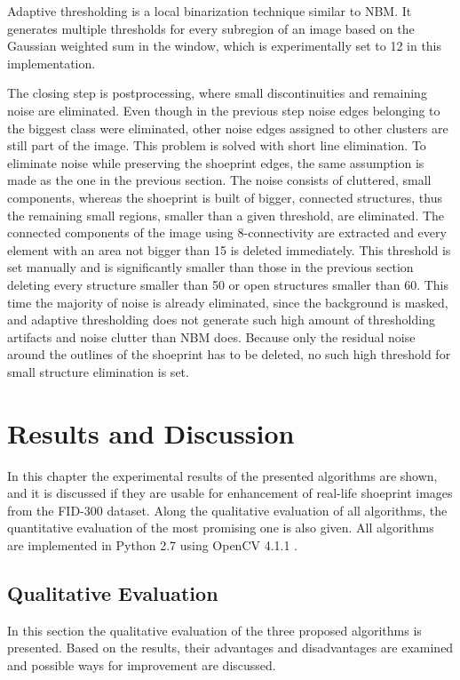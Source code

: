 \documentclass[draft,final]{vutinfth} %
\begin{document}
Adaptive thresholding is a local binarization technique similar to NBM.
It generates multiple thresholds for every subregion of an image based on the Gaussian weighted sum in the window, which is experimentally set to 12 in this implementation.
\par
The closing step is postprocessing, where small discontinuities and remaining noise are eliminated.
Even though in the previous step noise edges belonging to the biggest class were eliminated, other noise edges assigned to other clusters are still part of the image.
This problem is solved with short line elimination.
To eliminate noise while preserving the shoeprint edges, the same assumption is made as the one in the previous section.
The noise consists of cluttered, small components, whereas the shoeprint is built of bigger, connected structures, thus the remaining small regions, smaller than a given threshold, are eliminated.
The connected components of the image using 8-connectivity are extracted and every element with an area not bigger than 15 is deleted immediately.
This threshold is set manually and is significantly smaller than those in the previous section deleting every structure smaller than 50 or open structures smaller than 60.
This time the majority of noise is already eliminated, since the background is masked, and adaptive thresholding does not generate such high amount of thresholding artifacts and noise clutter than NBM does.
Because only the residual noise around the outlines of the shoeprint has to be deleted, no such high threshold for small structure elimination is set.

\chapter{Results and Discussion}
\label{results}
\par
In this chapter the experimental results of the presented algorithms are shown, and it is discussed if they are usable for enhancement of real-life shoeprint images from the FID-300 dataset.
Along the qualitative evaluation of all algorithms, the quantitative evaluation of the most promising one is also given.
All algorithms are implemented in Python 2.7 \cite{van1995python} using OpenCV 4.1.1 \cite{opencv_library}.

\section{Qualitative Evaluation}
In this section the qualitative evaluation of the three proposed algorithms is presented.
Based on the results, their advantages and disadvantages are examined and possible ways for improvement are discussed.  
\end{document}
